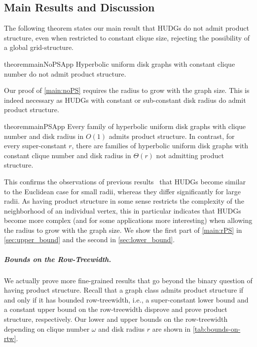 \documentclass[11pt]{article}
\begin{document}
\subsection{Main Results and Discussion}
%
The following theorem states our main result that HUDGs do not admit product structure, even when restricted to constant clique size, rejecting the possibility of a global grid-structure. 
%
\begin{restatable}{theorem}{mainNoPSApp}\label{main:noPS}
    Hyperbolic uniform disk graphs with constant clique number do not admit product structure.
\end{restatable}
%
Our proof of \cref{main:noPS} requires the radius to grow with the graph size.
This is indeed necessary as HUDGs with constant or sub-constant disk radius do admit product structure.
%
\begin{restatable}{theorem}{mainPSApp}\label{main:rPS}
    Every family of hyperbolic uniform disk graphs with clique number and disk radius in $ O(1) $ admits product structure.
    In contrast, for every super-constant $ r $, there are families of hyperbolic uniform disk graphs with constant clique number and disk radius in  $ \Theta(r) $ not admitting product structure.
\end{restatable}%
%
This confirms the observations of previous results~\cite{Struc_Indep_Hyper_Unifor_Disk_Graph-Blaesius25,blasius_strongly_2023} that HUDGs become similar to the Euclidean case for small radii, whereas they differ significantly for large radii.
As having product structure in some sense restricts the complexity of the neighborhood of an individual vertex, this in particular indicates that HUDGs become more complex (and for some applications more interesting) when allowing the radius to grow with the graph size.
We show the first part of \cref{main:rPS} in \cref{sec:upper_bound} and the second in \cref{sec:lower_bound}.
%
\subparagraph{Bounds on the Row-Treewidth.}
%
We actually prove more fine-grained results that go beyond the binary question of having product structure.
Recall that a graph class admits product structure if and only if it has bounded row-treewidth, i.e., a super-constant lower bound and a constant upper bound on the row-treewidth disprove and prove product structure, respectively.
%
Our lower and upper bounds on the row-treewidth depending on clique number $\omega$ and disk radius $r$ are shown in \cref{tab:bounds-on-rtw}.
\end{document}
